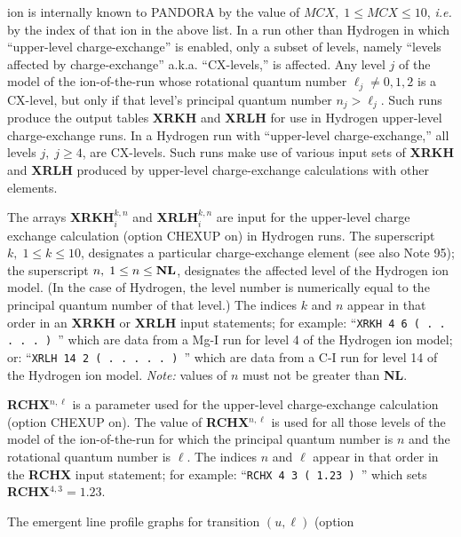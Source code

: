 ion is internally known to PANDORA by the value of $MCX, \; 1 \leq MCX \leq 10$,
{\it i.e.} by the index of that ion in the above list. \np
In a run other than Hydrogen in which ``upper-level charge-exchange'' is
enabled, only a subset of levels, namely ``levels affected by charge-exchange''
a.k.a. ``CX-levels,'' is affected. Any level $j$ of the model of the 
ion-of-the-run whose rotational quantum number $\ell_j \neq 0, 1, 2$ is a
CX-level, but only if that level's principal quantum number $n_j > \ell_j$.
Such runs produce the output tables {\bf XRKH} and {\bf XRLH} for
use in Hydrogen upper-level charge-exchange runs. \np
In a Hydrogen run with ``upper-level charge-exchange,''
all levels $j, \; j \geq 4$, are CX-levels. Such runs make use of various
input sets of {\bf XRKH} and {\bf XRLH} produced by upper-level charge-exchange
calculations with other elements.
\ej
\centerline{}
\space \noindent
The arrays {\bf XRKH}$^{k,n}_i$ and {\bf XRLH}$^{k,n}_i$ are input for the
upper-level charge exchange calculation (option CHEXUP on) in Hydrogen runs. \np
The superscript $k, \; 1 \leq k \leq 10$, designates a particular
charge-exchange element (see also Note 95); the superscript $n, \; 1 \leq n 
\leq {\bf NL}$, designates the affected level of the Hydrogen ion model.
(In the case of Hydrogen, the level number is numerically equal to the
principal quantum number of that level.) The indices $k$ and $n$ appear
in that order in an {\bf XRKH} or {\bf XRLH} input statements; for example: \np
``{\tt XRKH 4 6 ( . . . . . ) }'' \np
which are data from a Mg-I run for level 4 of the Hydrogen ion model; or: \np
``{\tt XRLH 14 2 ( . . . . . ) }'' \np
which are data from a C-I run for level 14 of the Hydrogen ion model. \np
{\it Note:} values of $n$ must not be greater than {\bf NL}.
\blankline
\blankline
\centerline{}
\space \noindent
{\bf RCHX}$^{n,\ell}$ is a parameter used for the upper-level charge-exchange
calculation (option CHEXUP on). The value of {\bf RCHX}$^{n,\ell}$ is used
for all those levels of the model of the ion-of-the-run for which the
principal quantum number is $n$ and the rotational quantum number is $\ell$.
The indices $n$ and $\ell$ appear in that order in the {\bf RCHX} input
statement; for example: \np
``{\tt RCHX 4 3 ( 1.23 ) }'' \np
which sets {\bf RCHX}$^{4,3} = 1.23$.
\blankline
\blankline
\centerline{}
\space \noindent
The emergent line profile graphs for transition $(u,\ell)$ (option
